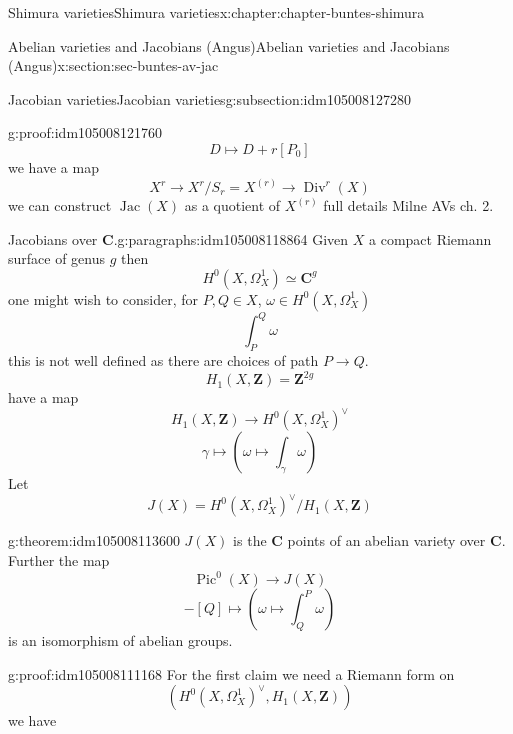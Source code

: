 \documentclass[oneside,10pt,]{book}
\numberwithin{equation}{section}
\newcommand{\ZZ}{\mathbf{Z}}
\newcommand{\CC}{\mathbf{C}}
\DeclareMathOperator{\divisors}{Div}
\DeclareMathOperator{\Pic}{Pic}
\DeclareMathOperator{\Jac}{Jac}
\begin{document}
\begin{chapterptx}{Shimura varieties}{}{Shimura varieties}{}{}{x:chapter:chapter-buntes-shimura}
\begin{sectionptx}{Abelian varieties and Jacobians (Angus)}{}{Abelian varieties and Jacobians (Angus)}{}{}{x:section:sec-buntes-av-jac}
\begin{subsectionptx}{Jacobian varieties}{}{Jacobian varieties}{}{}{g:subsection:idm105008127280}
\begin{proofptx}{}{g:proof:idm105008121760}
%
\begin{equation*}
D \mapsto D + r[P_0]
\end{equation*}
we have  a map%
\begin{equation*}
X^r \to X^r/ S_r = X^{(r)} \to \divisors^r(X)
\end{equation*}
we can construct \(\Jac(X)\) as a quotient of \(X^{(r)}\) full details Milne AVs ch. 2.%
\end{proofptx}
\begin{paragraphs}{Jacobians over \(\CC\).}{g:paragraphs:idm105008118864}%
Given \(X\) a compact Riemann surface of genus \(g\) then%
\begin{equation*}
H^0(X, \Omega_X^1) \simeq \CC^g
\end{equation*}
one might wish to consider, for \(P,Q \in X\), \(\omega\in H^0(X, \Omega_X^1)\)%
\begin{equation*}
\int_P^Q \omega
\end{equation*}
this is not well defined as there are choices of path \(P\to Q\).%
\begin{equation*}
H_1(X,\ZZ) = \ZZ^{2g}
\end{equation*}
have  a map%
\begin{equation*}
H_1(X,\ZZ) \to H^0(X, \Omega_X^1) ^\vee
\end{equation*}
%
\begin{equation*}
\gamma \mapsto (\omega \mapsto \int_\gamma \omega)
\end{equation*}
Let%
\begin{equation*}
J(X) = H^0(X, \Omega_X^1) ^\vee/H_1(X,\ZZ)
\end{equation*}
%
\begin{theorem}{}{}{g:theorem:idm105008113600}%
\(J(X) \) is the \(\CC\) points of an abelian variety over \(\CC\). Further the map%
\begin{equation*}
\Pic^0(X) \to J(X)
\end{equation*}
%
\begin{equation*}
[P] - [Q] \mapsto (\omega \mapsto \int^P_Q \omega)
\end{equation*}
is an isomorphism of abelian groups.%
\end{theorem}
\begin{proofptx}{}{g:proof:idm105008111168}
For the first claim we need a Riemann form on%
\begin{equation*}
(H^0(X, \Omega_X^1)^\vee , H_1(X,\ZZ))
\end{equation*}
we have%
\begin{equation*}

\end{equation*}
\end{proofptx}
\end{paragraphs}
\end{subsectionptx}
\end{sectionptx}
\end{chapterptx}
\end{document}
